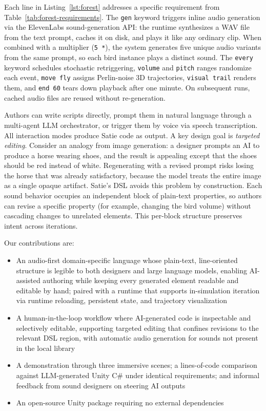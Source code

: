 \documentclass[sigconf,anonymous,review]{nimeart}
\begin{document}
Each line in Listing~\ref{lst:forest} addresses a specific requirement from Table~\ref{tab:forest-requirements}. The \texttt{gen} keyword triggers inline audio generation via the ElevenLabs sound-generation API: the runtime synthesizes a WAV file from the text prompt, caches it on disk, and plays it like any ordinary clip. When combined with a multiplier (\texttt{5~*}), the system generates five unique audio variants from the same prompt, so each bird instance plays a distinct sound. The \texttt{every} keyword schedules stochastic retriggering, \texttt{volume} and \texttt{pitch} ranges randomize each event, \texttt{move~fly} assigns Perlin-noise 3D trajectories, \texttt{visual~trail} renders them, and \texttt{end~60} tears down playback after one minute. On subsequent runs, cached audio files are reused without re-generation.

Authors can write scripts directly, prompt them in natural language through a multi-agent LLM orchestrator, or trigger them by voice via speech transcription. All interaction modes produce Satie code as output. A key design goal is \textit{targeted editing}. Consider an analogy from image generation: a designer prompts an AI to produce a horse wearing shoes, and the result is appealing except that the shoes should be red instead of white. Regenerating with a revised prompt risks losing the horse that was already satisfactory, because the model treats the entire image as a single opaque artifact. Satie's DSL avoids this problem by construction. Each sound behavior occupies an independent block of plain-text properties, so authors can revise a specific property (for example, changing the bird volume) without cascading changes to unrelated elements. This per-block structure preserves intent across iterations.

Our contributions are:
\begin{itemize}
    \item An audio-first domain-specific language whose plain-text, line-oriented structure is legible to both designers and large language models, enabling AI-assisted authoring while keeping every generated element readable and editable by hand; paired with a runtime that supports in-simulation iteration via runtime reloading, persistent state, and trajectory visualization
    \item A human-in-the-loop workflow where AI-generated code is inspectable and selectively editable, supporting targeted editing that confines revisions to the relevant DSL region, with automatic audio generation for sounds not present in the local library
    \item A demonstration through three immersive scenes; a lines-of-code comparison against LLM-generated Unity C\# under identical requirements; and informal feedback from sound designers on steering AI outputs
    \item An open-source Unity package requiring no external dependencies
\end{itemize}
\end{document}
